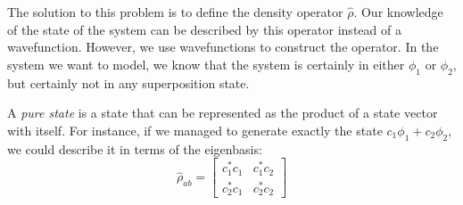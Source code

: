 The solution to this problem is to define the density operator $\hat{\rho}$. Our knowledge of the
state of the system can be described by this operator instead of a wavefunction. However, we use
wavefunctions to construct the operator. In the system we want to model, we know that the system is
certainly in either $\phi_1$ or $\phi_2$, but certainly not in any superposition state.

A \textit{pure state} is a state that can be represented as the product of a state vector with
itself. For instance, if we managed to generate exactly the state $c_1\phi_1 + c_2\phi_2$, we could
describe it in terms of the eigenbasis:
\begin{equation}
\hat{\rho}_{ab} =
\begin{bmatrix}
    c_1^* c_1   &   c_1^* c_2   \\
    c_2^* c_1   &   c_2^* c_2   
\end{bmatrix}
\end{equation}

